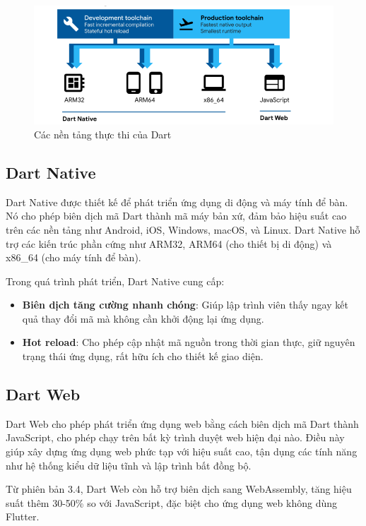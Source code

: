 \documentclass[../DoAn.tex]{subfiles}
\numberwithin{figure}{chapter}
\begin{document}
\begin{figure}[H]
    \centering
    \includegraphics[width=1\textwidth]{Hinhve/dartPlatform.png}
    \caption{Các nền tảng thực thi của Dart}
    \label{fig:dart_platforms}
\end{figure}

\subsection{Dart Native}

Dart Native được thiết kế để phát triển ứng dụng di động và máy tính để bàn. Nó cho phép biên dịch mã Dart thành mã máy bản xứ, đảm bảo hiệu suất cao trên các nền tảng như Android, iOS, Windows, macOS, và Linux. Dart Native hỗ trợ các kiến trúc phần cứng như ARM32, ARM64 (cho thiết bị di động) và x86\_64 (cho máy tính để bàn).

Trong quá trình phát triển, Dart Native cung cấp:
\begin{itemize}
    \item \textbf{Biên dịch tăng cường nhanh chóng}: Giúp lập trình viên thấy ngay kết quả thay đổi mã mà không cần khởi động lại ứng dụng.
    \item \textbf{Hot reload}: Cho phép cập nhật mã nguồn trong thời gian thực, giữ nguyên trạng thái ứng dụng, rất hữu ích cho thiết kế giao diện.
\end{itemize}



\subsection{Dart Web}

Dart Web cho phép phát triển ứng dụng web bằng cách biên dịch mã Dart thành JavaScript, cho phép chạy trên bất kỳ trình duyệt web hiện đại nào. Điều này giúp xây dựng ứng dụng web phức tạp với hiệu suất cao, tận dụng các tính năng như hệ thống kiểu dữ liệu tĩnh và lập trình bất đồng bộ.

Từ phiên bản 3.4, Dart Web còn hỗ trợ biên dịch sang WebAssembly, tăng hiệu suất thêm 30-50\% so với JavaScript, đặc biệt cho ứng dụng web không dùng Flutter.
\end{document}
